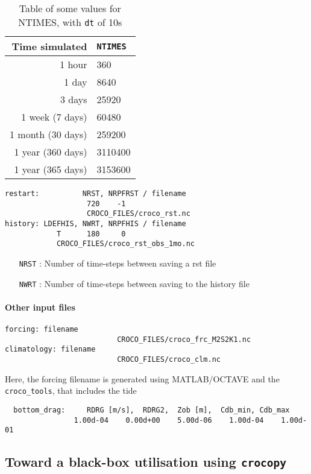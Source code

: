 \documentclass{article}
\begin{document}
\begin{table}[!h]
  \centering
  \begin{tabular}{rl} \hline
   Time simulated & \texttt{NTIMES} \\ \hline
    1 hour & 360 \\
    1 day & 8640 \\
    3 days & 25920 \\
    1 week (7 days)& 60480 \\
    1 month (30 days) & 259200 \\
    1 year (360 days) & 3110400 \\
    1 year (365 days) & 3153600 \\ \hline
  \end{tabular}
  \caption{Table of some values for NTIMES, with \texttt{dt} of 10s}
  \label{tab:NTIMESref}
\end{table}
\begin{lstlisting}
restart:          NRST, NRPFRST / filename
                   720    -1
                   CROCO_FILES/croco_rst.nc
history: LDEFHIS, NWRT, NRPFHIS / filename
            T      180     0
            CROCO_FILES/croco_rst_obs_1mo.nc
\end{lstlisting}
\begin{itemize}
\item[\texttt{NRST}]: Number of time-steps between saving a rst file
\item[\texttt{NWRT}]: Number of time-steps between saving to the history file 
\end{itemize}
\paragraph{Other input files}
\begin{lstlisting}
forcing: filename
                          CROCO_FILES/croco_frc_M2S2K1.nc
climatology: filename
                          CROCO_FILES/croco_clm.nc
\end{lstlisting}
Here, the forcing filename is generated using \textsc{MATLAB/OCTAVE} and the \texttt{croco\_tools}, that includes the tide                        


\begin{lstlisting}
  bottom_drag:     RDRG [m/s],  RDRG2,  Zob [m],  Cdb_min, Cdb_max
                1.00d-04    0.00d+00    5.00d-06    1.00d-04    1.00d-01
\end{lstlisting}

\subsection{Toward a black-box utilisation using \texttt{crocopy}}
\end{document}
